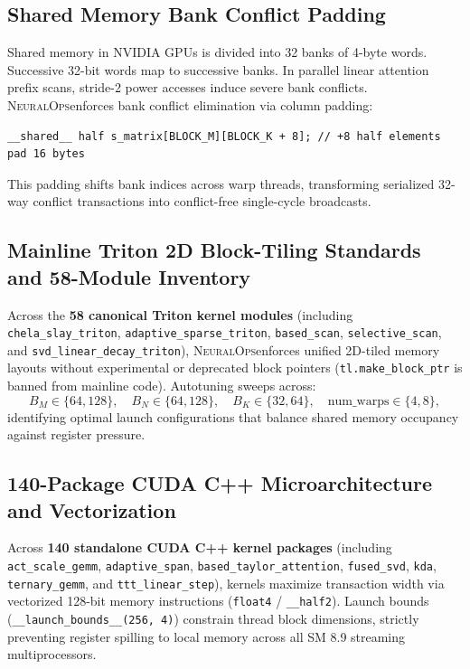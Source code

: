 \documentclass{article}
\newcommand{\systemname}{\textsc{NeuralOps}}
\begin{document}
\subsection{Shared Memory Bank Conflict Padding}
Shared memory in NVIDIA GPUs is divided into 32 banks of 4-byte words. Successive 32-bit words map to successive banks. In parallel linear attention prefix scans, stride-2 power accesses induce severe bank conflicts. \systemname enforces bank conflict elimination via column padding:
\begin{verbatim}
__shared__ half s_matrix[BLOCK_M][BLOCK_K + 8]; // +8 half elements pad 16 bytes
\end{verbatim}
This padding shifts bank indices across warp threads, transforming serialized 32-way conflict transactions into conflict-free single-cycle broadcasts.

\subsection{Mainline Triton 2D Block-Tiling Standards and 58-Module Inventory}
Across the \textbf{58 canonical Triton kernel modules} (including \texttt{chela\_slay\_triton}, \texttt{adaptive\_sparse\_triton}, \texttt{based\_scan}, \texttt{selective\_scan}, and \texttt{svd\_linear\_decay\_triton}), \systemname enforces unified 2D-tiled memory layouts without experimental or deprecated block pointers (\texttt{tl.make\_block\_ptr} is banned from mainline code). Autotuning sweeps across:
\begin{equation}
    B_M \in \{64, 128\}, \quad B_N \in \{64, 128\}, \quad B_K \in \{32, 64\}, \quad \text{num\_warps} \in \{4, 8\},
\end{equation}
identifying optimal launch configurations that balance shared memory occupancy against register pressure.

\subsection{140-Package CUDA C++ Microarchitecture and Vectorization}
Across \textbf{140 standalone CUDA C++ kernel packages} (including \texttt{act\_scale\_gemm}, \texttt{adaptive\_span}, \texttt{based\_taylor\_attention}, \texttt{fused\_svd}, \texttt{kda}, \texttt{ternary\_gemm}, and \texttt{ttt\_linear\_step}), kernels maximize transaction width via vectorized 128-bit memory instructions (\texttt{float4} / \texttt{\_\_half2}). Launch bounds (\texttt{\_\_launch\_bounds\_\_(256, 4)}) constrain thread block dimensions, strictly preventing register spilling to local memory across all SM 8.9 streaming multiprocessors.
\end{document}

